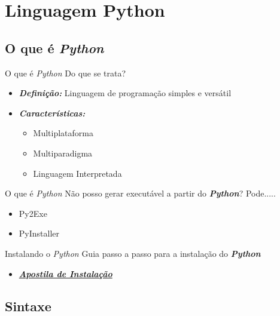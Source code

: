 \documentclass{beamer}
\begin{document}
\section{Linguagem Python}

\subsection{O que é \textit{Python}}

\begin{frame}{O que é \textit{Python}}
	Do que se trata?
	\begin{itemize}
		\item \textbf{\textit{Definição:}} Linguagem de programação simples e versátil
		\item \textbf{\textit{Características:}}
		\begin{itemize}
			\item Multiplataforma
			\item Multiparadigma
			\item Linguagem Interpretada
		\end{itemize}
	\end{itemize}
\end{frame}

\begin{frame}{O que é \textit{Python}}
	Não posso gerar executável a partir do \textbf{\textit{Python}}? Pode.....
	\begin{itemize}
		\item Py2Exe
		\item PyInstaller
	\end{itemize}
\end{frame}

\begin{frame}{Instalando o \textit{Python}}
	Guia passo a passo para a instalação do \textbf{\textit{Python}}
	
	\begin{itemize}
		\item \href{bibliografia/Guia_Instalacao_Python.pdf}{\textbf{\textit{Apostila de Instalação}}}
	\end{itemize}
	
\end{frame}


\subsection{Sintaxe}
\end{document}
